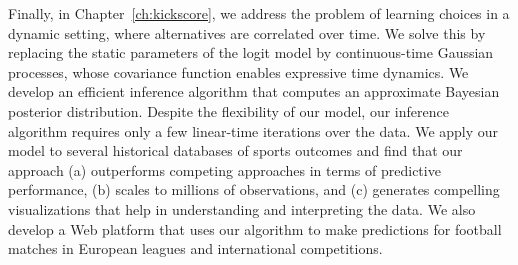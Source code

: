 Finally, in Chapter~\ref{ch:kickscore}, we address the problem of learning choices in a dynamic setting, where alternatives are correlated over time.
We solve this by replacing the static parameters of the logit model by continuous-time Gaussian processes, whose covariance function enables expressive time dynamics.
We develop an efficient inference algorithm that computes an approximate Bayesian posterior distribution.
Despite the flexibility of our model, our inference algorithm requires only a few linear-time iterations over the data.
We apply our model to several historical databases of sports outcomes and find that our approach (a) outperforms competing approaches in terms of predictive performance, (b) scales to millions of observations, and (c) generates compelling visualizations that help in understanding and interpreting the data.
We also develop a Web platform that uses our algorithm to make predictions for football matches in European leagues and international competitions.

